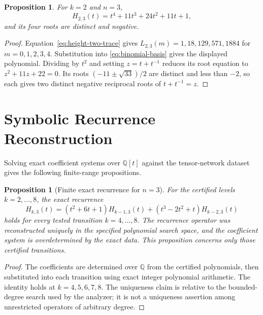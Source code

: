 \documentclass[11pt,a4paper]{article}
\newtheorem{proposition}[theorem]{Proposition}
\theoremstyle{definition}
\begin{document}
\begin{proposition}\label{prop:k23}
For $k=2$ and $n=3$,
\[
H_{2,3}(t)=t^4+11t^3+24t^2+11t+1,
\]
and its four roots are distinct and negative.
\end{proposition}

\begin{proof}
Equation~\eqref{eq:height-two-trace} gives $L_{2,3}(m)=1,18,129,571,1884$ for $m=0,1,2,3,4$. Substitution into \eqref{eq:binomial-basis} gives the displayed polynomial. Dividing by $t^2$ and setting $z=t+t^{-1}$ reduces its root equation to $z^2+11z+22=0$. Its roots $(-11\pm\sqrt{33})/2$ are distinct and less than $-2$, so each gives two distinct negative reciprocal roots of $t+t^{-1}=z$.
\end{proof}

\section{Symbolic Recurrence Reconstruction}
\label{sec:recurrences}

Solving exact coefficient systems over $\mathbb{Q}[t]$ against the
tensor-network dataset gives the following finite-range propositions.

\begin{proposition}[Finite exact recurrence for $n=3$]
\label{prop:recurrence-n3}
For the certified levels $k=2,\ldots,8$, the exact recurrence
\begin{equation}\label{eq:recurrence-n3}
H_{k,3}(t)
=(t^2+6t+1)H_{k-1,3}(t)
+(t^3-2t^2+t)H_{k-2,3}(t)
\end{equation}
holds for every tested transition $k=4,\ldots,8$. The recurrence
operator was reconstructed uniquely in the specified polynomial search
space, and the coefficient system is overdetermined by the exact data.
This proposition concerns only those certified transitions.
\end{proposition}

\begin{proof}
The coefficients are determined over $\mathbb{Q}$ from the certified
polynomials, then substituted into each transition using exact integer
polynomial arithmetic. The identity holds at $k=4,5,6,7,8$. The
uniqueness claim is relative to the bounded-degree search used by the
analyzer; it is not a uniqueness assertion among unrestricted operators
of arbitrary degree.
\end{proof}
\end{document}
